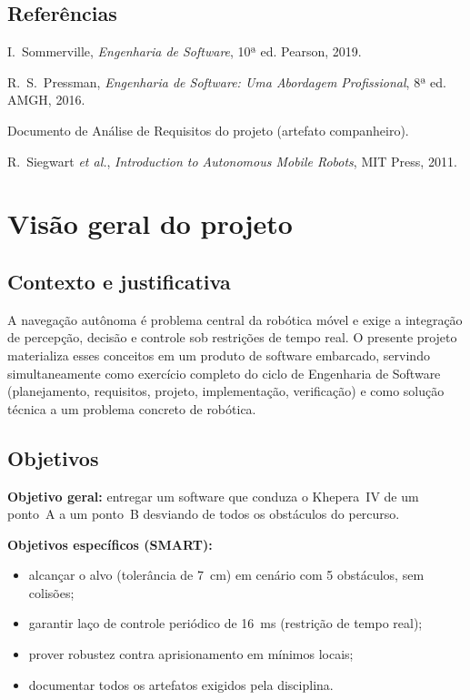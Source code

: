 \subsection{Referências}
\begin{enumerate}[label={[}\arabic*{]},leftmargin=1.2cm,noitemsep]
  \item I.~Sommerville, \emph{Engenharia de Software}, 10ª ed. Pearson, 2019.
  \item R.~S.~Pressman, \emph{Engenharia de Software: Uma Abordagem Profissional}, 8ª ed. AMGH, 2016.
  \item Documento de Análise de Requisitos do projeto (artefato companheiro).
  \item R.~Siegwart \emph{et al.}, \emph{Introduction to Autonomous Mobile Robots}, MIT Press, 2011.
\end{enumerate}

\section{Visão geral do projeto}
\subsection{Contexto e justificativa}
A navegação autônoma é problema central da robótica móvel e exige a integração de percepção, decisão e controle sob restrições de tempo real. O presente projeto materializa esses conceitos em um produto de software embarcado, servindo simultaneamente como exercício completo do ciclo de Engenharia de Software (planejamento, requisitos, projeto, implementação, verificação) e como solução técnica a um problema concreto de robótica.

\subsection{Objetivos}
\textbf{Objetivo geral:} entregar um software que conduza o Khepera~IV de um ponto~A a um ponto~B desviando de todos os obstáculos do percurso.

\noindent\textbf{Objetivos específicos (SMART):}
\begin{itemize}[noitemsep,topsep=2pt]
  \item alcançar o alvo (tolerância de 7~cm) em cenário com 5 obstáculos, sem colisões;
  \item garantir laço de controle periódico de 16~ms (restrição de tempo real);
  \item prover robustez contra aprisionamento em mínimos locais;
  \item documentar todos os artefatos exigidos pela disciplina.
\end{itemize}

